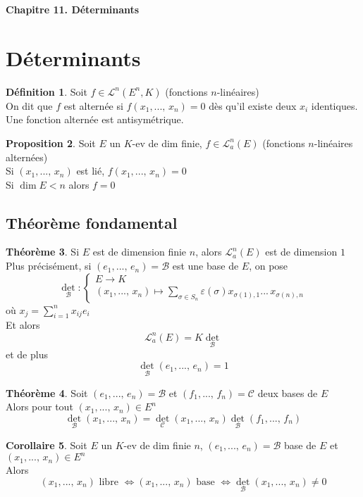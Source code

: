 \documentclass[10pt,a4paper]{article}
\theoremstyle{definition}
\newtheorem{proposition}{Proposition}[section]
\newtheorem{theorem}[proposition]{Théorème}
\newtheorem{corollaire}[proposition]{Corollaire}
\newtheorem{definition}[proposition]{Définition}
\begin{document}
\renewcommand{\labelitemi}{$*$}
\begin{center}
{\Large \textbf{Chapitre 11. Déterminants}}
\end{center}

\section{Déterminants}
\begin{definition}
Soit $f \in \mathcal{L}^n(E^n, K)$ (fonctions $n$-linéaires) \\
On dit que $f$ est alternée si $f(x_1, ...,\, x_n) = 0$ dès qu'il existe deux $x_i$ identiques. \\
Une fonction alternée est antisymétrique.
\end{definition}

\begin{proposition}
Soit $E$ un $K$-ev de dim finie, $f \in \mathcal{L}^n_a(E)$ (fonctions $n$-linéaires alternées) \\
Si $(x_1, ...,\, x_n)$ est lié, $f(x_1, ...,\, x_n) = 0$ \\
Si $\dim E < n$ alors $f = 0$
\end{proposition}

\subsection{Théorème fondamental}
\begin{theorem}
Si $E$ est de dimension finie $n$, alors $\mathcal{L}^n_a(E)$ est de dimension $1$ \\
Plus précisément, si $(e_1, ...,\, e_n) = \mathcal{B}$ est une base de $E$, on pose
\[ \det_\mathcal{B} : \begin{cases}
E \to K \\
(x_1, ...,\, x_n) \mapsto \sum\limits_{\sigma \in S_n} \varepsilon(\sigma) x_{\sigma(1), 1} ...\, x_{\sigma(n), n}
\end{cases} \]
où $x_j = \sum\limits_{i = 1}^{n}x_{ij} e_i$ \\
Et alors
\[ \mathcal{L}^n_a(E) = K \underset{\mathcal{B}}\det \]
et de plus 
\[ \underset{\mathcal{B}}\det(e_1, ...,\, e_n) = 1 \]
\end{theorem}
\begin{theorem}
Soit $(e_1, ...,\, e_n) = \mathcal{B}$ et $(f_1, ...,\, f_n) = \mathcal{C}$ deux bases de $E$ \\
Alors pour tout $(x_1, ...,\, x_n) \in E^n$
\[ \underset{\mathcal{B}}\det(x_1, ...,\, x_n) = \underset{\mathcal{C}}\det(x_1, ...,\, x_n) \underset{\mathcal{B}}\det(f_1, ...,\, f_n) \]
\end{theorem}
\begin{corollaire}
Soit $E$ un $K$-ev de dim finie $n$, $(e_1, ...,\, e_n) = \mathcal{B}$ base de $E$ et $(x_1, ...,\, x_n) \in E^n$ \\
Alors
\[ (x_1, ...,\, x_n) \text{ libre } \iff (x_1, ...,\, x_n) \text{ base } \iff \underset{\mathcal{B}}\det(x_1, ...,\, x_n) \neq 0 \]
\end{corollaire}
\end{document}
